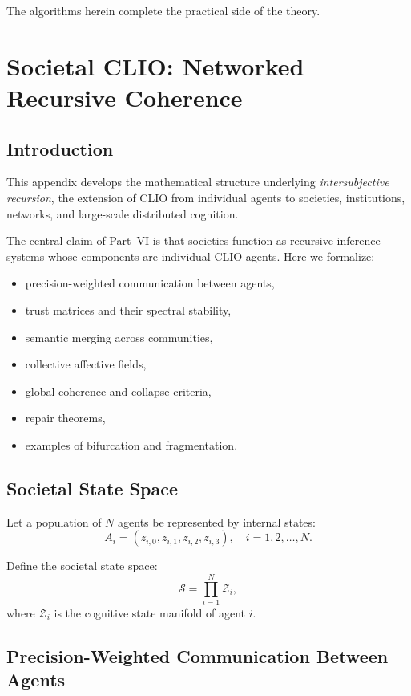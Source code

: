 \documentclass[12pt,oneside]{book}
\theoremstyle{plain}
\theoremstyle{definition}
\begin{document}
The algorithms herein complete the practical side of the theory.

\chapter{Societal CLIO: Networked Recursive Coherence}
\label{app:societal_clio}

\section{Introduction}

This appendix develops the mathematical structure underlying
\emph{intersubjective recursion}, the extension of CLIO from individual
agents to societies, institutions, networks, and large-scale distributed
cognition.

The central claim of Part~VI is that societies function as
recursive inference systems whose components are individual CLIO agents.
Here we formalize:

\begin{itemize}
  \item precision-weighted communication between agents,
  \item trust matrices and their spectral stability,
  \item semantic merging across communities,
  \item collective affective fields,
  \item global coherence and collapse criteria,
  \item repair theorems,
  \item examples of bifurcation and fragmentation.
\end{itemize}

\section{Societal State Space}

Let a population of $N$ agents be represented by internal states:
\[
A_i = (z_{i,0}, z_{i,1}, z_{i,2}, z_{i,3}), \quad i = 1,2,\dots,N.
\]

Define the societal state space:
\[
\mathcal{S} = \prod_{i=1}^{N} \mathcal{Z}_i,
\]
where $\mathcal{Z}_i$ is the cognitive state manifold of agent $i$.

\section{Precision-Weighted Communication Between Agents}
\end{document}
